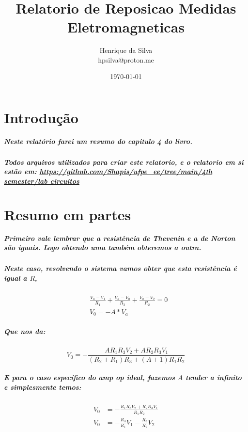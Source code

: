\documentclass[12pt,twoside, a4paper, twocolumn]{article}
\title{Relatorio de Reposicao Medidas Eletromagneticas}
\author{Henrique da Silva \\ hpsilva@proton.me}
\date{\today}
\begin{document}
\maketitle
{}
\newpage
\tableofcontents
\newpage



\section{Introdução}


\subparagraph*{Neste relatório farei um resumo do capitulo 4 do livro.}

\subparagraph*{Todos arquivos utilizados para criar este relatorio, e o relatorio em si estão em:  \url{https://github.com/Shapis/ufpe_ee/tree/main/4th semester/lab circuitos}}



\section{Resumo em partes}


\subparagraph*{Primeiro vale lembrar que a resistência de Thevenin e a de Norton são iguais. Logo obtendo uma também obteremos a outra.
}

\subparagraph*{Neste caso, resolvendo o sistema vamos obter que esta resistência é igual a $R_{c}$}

\begin{equation}
    \begin{aligned}
         & \frac{V_a - V_1}{R_1} + \frac{V_a-V_0}{R_3} + \frac{V_a-V_2}{R_2} = 0 \\
         & V_0 = -A*V_a
    \end{aligned}
\end{equation}

\subparagraph*{Que nos da:}

\begin{equation}
    V_0 = -\frac{A R_1 R_3 V_2 + A R_2 R_3 V_1}{(R_2 + R_1)R_3 + (A + 1) R_1 R_2}
\end{equation}

\subparagraph*{E para o caso específico do amp op ideal, fazemos $A$ tender a infinito e simplesmente temos:}

\begin{equation}
    \begin{aligned}
        V_0 & = -\frac{R_1 R_3 V_2 + R_2 R_3 V_1}{R_1 R_2} \\
        V_0 & = - \frac{R_3}{R_1}V_1 - \frac{R_3}{R_2}V_2  \\
    \end{aligned}
\end{equation}
\end{document}
